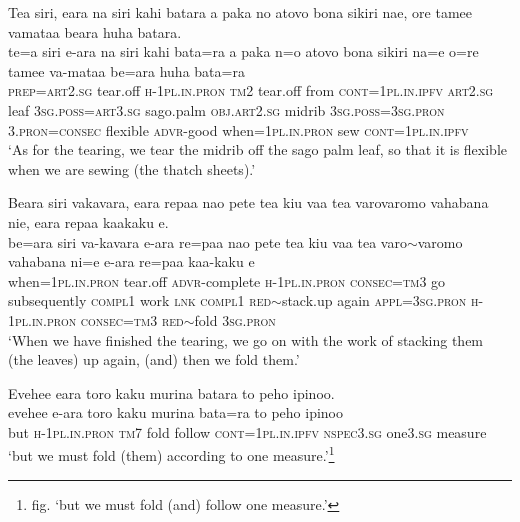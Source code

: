 \ea\label{ex:text12-14}
Tea siri, eara na siri kahi batara a paka no atovo bona sikiri nae, ore tamee vamataa beara huha batara.\\
\gll te=a	siri	e-ara	na	siri	kahi	bata=ra	a	paka	n=o	atovo	bona	sikiri	na=e	o=re	tamee	va-mataa	be=ara	huha	bata=ra\\
     \textsc{prep}=\textsc{art}2.\textsc{sg}	tear.off	\textsc{h}-1\textsc{pl}.\textsc{in}.\textsc{pron}	\textsc{tm}2	tear.off	from	\textsc{cont}=1\textsc{pl}.\textsc{in}.\textsc{ipfv}	\textsc{art}2.\textsc{sg}	leaf	3\textsc{sg}.\textsc{poss}=\textsc{art}3.\textsc{sg}	sago.palm	\textsc{obj}.\textsc{art}2.\textsc{sg}	midrib	3\textsc{sg}.\textsc{poss}=3\textsc{sg}.\textsc{pron}	3.\textsc{pron}=\textsc{consec}	flexible	\textsc{advr}-good	when=1\textsc{pl}.\textsc{in}.\textsc{pron}	sew	\textsc{cont}=1\textsc{pl}.\textsc{in}.\textsc{ipfv}\\
\glt `As for the tearing, we tear the midrib off the sago palm leaf, so that it is flexible when we are sewing (the thatch sheets).'
\z

\ea\label{ex:text12-15}
Beara siri vakavara, eara repaa nao pete tea kiu vaa tea varovaromo vahabana nie, eara repaa kaakaku e.\\
\gll be=ara	siri	va-kavara	e-ara	re=paa	nao	pete	tea	kiu	vaa	tea	varo{$\sim$}varomo	vahabana	ni=e	e-ara	re=paa	kaa-kaku	e\\
     when=1\textsc{pl}.\textsc{in}.\textsc{pron}	tear.off	\textsc{advr}-complete	\textsc{h}-1\textsc{pl}.\textsc{in}.\textsc{pron}	\textsc{consec}=\textsc{tm}3	go	subsequently	\textsc{compl}1	work	\textsc{lnk}	\textsc{compl}1	\textsc{red}{$\sim$}stack.up	again	\textsc{appl}=3\textsc{sg}.\textsc{pron}	\textsc{h}-1\textsc{pl}.\textsc{in}.\textsc{pron}	\textsc{consec}=\textsc{tm}3	\textsc{red}{$\sim$}fold	3\textsc{sg}.\textsc{pron}\\
\glt `When we have finished the tearing, we go on with the work of stacking them (the leaves) up again, (and) then we fold them.'
\z

\ea\label{ex:text12-16}
Evehee eara toro kaku murina batara to peho ipinoo.\\
\gll evehee	e-ara	toro	kaku	murina	bata=ra	to	peho	ipinoo\\
     but	\textsc{h}-1\textsc{pl}.\textsc{in}.\textsc{pron}	\textsc{tm}7	fold	follow	\textsc{cont}=1\textsc{pl}.\textsc{in}.\textsc{ipfv}	\textsc{nspec}3.\textsc{sg}	one3.\textsc{sg}	measure\\
\glt `but we must fold (them) according to one measure.'\footnote{fig. `but we must fold (and) follow one measure.'}
\z

